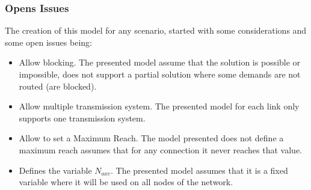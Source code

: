 

\vspace{13pt}
\subsubsection{Opens Issues}

The creation of this model for any scenario, started with some considerations and some open issues being:

\begin{itemize}
  \item Allow blocking.
  \subitem The presented model assume that the solution is possible or impossible, does not support a partial solution where some demands are not routed (are blocked).
  \item Allow multiple transmission system.
  \subitem The presented model for each link only supports one transmission system.
  \item Allow to set a Maximum Reach.
  \subitem The model presented does not define a maximum reach assumes that for any connection it never reaches that value.
  \item Defines the variable $N_{oxc}$.
  \subitem The presented model assumes that it is a fixed variable where it will be used on all nodes of the network.
\end{itemize}

